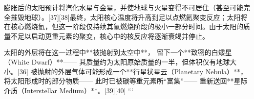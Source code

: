 膨胀后的太阳预计将汽化水星与金星，并使地球与火星变得不可居住（甚至可能完全摧毁地球）。[37][38]最终，太阳核心温度将升高到足以点燃氦聚变反应；太阳将在核心燃烧氦，但这一阶段仅持续其氢燃烧阶段的极小一部分时间。由于太阳的质量不足以启动更重元素的聚变，核心中的核反应将逐渐衰竭并停止。  

太阳的外层将在这一过程中**被抛射到太空中**，  
留下一个**致密的白矮星（White Dwarf）**——  
其质量约为太阳原始质量的一半，但体积仅有地球大小。[36]  
被抛射的外层气体可能形成一个**行星状星云（Planetary Nebula）**，  
将太阳形成时的部分物质——  
此时已被碳等重元素所“富集”——  
重新送回**星际介质（Interstellar Medium）**。[39][40]
```
